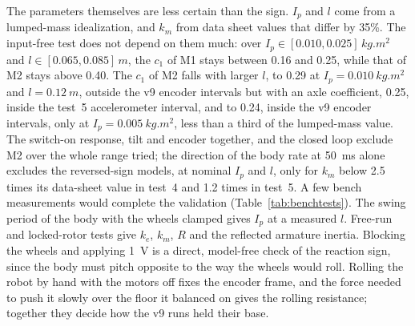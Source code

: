 The parameters themselves are less certain than the sign. $I_p$ and $l$ come
from a lumped-mass idealization, and $k_m$ from data sheet values that differ by
35\%. The input-free test does not depend on them much: over
$I_p\in[0.010,0.025]\,\si{kg.m^2}$ and $l\in[0.065,0.085]\,\si{m}$, the $c_1$ of
M1 stays between 0.16 and 0.25, while that of M2 stays above 0.40. The $c_1$ of
M2 falls with larger $l$, to 0.29 at $I_p=\SI{0.010}{kg.m^2}$ and
$l=\SI{0.12}{m}$, outside the v9 encoder intervals but with an axle
coefficient, 0.25, inside the test~5 accelerometer interval, and to 0.24,
inside the v9 encoder intervals, only at $I_p=\SI{0.005}{kg.m^2}$, less than a
third of the lumped-mass value. The switch-on response, tilt and encoder
together, and the closed loop exclude M2 over the whole range tried; the
direction of the body rate at \SI{50}{ms} alone excludes the reversed-sign
models, at nominal $I_p$ and $l$, only for $k_m$ below 2.5 times its data-sheet
value in test~4 and 1.2 times in test~5. A few bench measurements would
complete the validation (Table~\ref{tab:benchtests}). The swing period of the
body with the wheels clamped gives $I_p$ at a measured $l$. Free-run and
locked-rotor tests give $k_e$, $k_m$, $R$ and the reflected armature inertia.
Blocking the wheels and applying \SI{1}{V} is a direct, model-free check of the
reaction sign, since the body must pitch opposite to the way the wheels would
roll. Rolling the robot by hand with the motors off fixes the encoder frame,
and the force needed to push it slowly over the floor it balanced on gives the
rolling resistance; together they decide how the v9 runs held their base.

